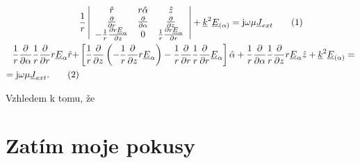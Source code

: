 \documentclass[12pt,a4paper,oneside]{article}
\numberwithin{equation}{section} %
\numberwithin{figure}{section} %
\numberwithin{table}{section} %
\newcommand{\mj}{\mathrm{j}} %
\newcommand{\faz}[1]{{\underline{#1}}} %
\newcommand\numberthis{\addtocounter{equation}{1}\tag{\theequation}}
\begin{document}
\begin{subequations}
\begin{align*}
&\frac{1}{r} \left|
\begin{array}{c c c}
\hat{r} & r\hat{\alpha} & \hat{z} \\
\frac{\partial}{\partial r} & \frac{\partial}{\partial \alpha} & \frac{\partial}{\partial z} \\
- \frac{1}{r} \frac{\partial r \faz{E} _{\alpha}}{\partial z} & 0 & \frac{1}{r} \frac{\partial r \faz{E} _{\alpha}}{\partial r}
\end{array} \right|
+ \faz{k} ^2 \faz{E} _{(\alpha)} = \mj \omega \mu \faz{J} _{ext} 
\numberthis
\\
\frac{1}{r} \frac{\partial}{\partial \alpha} \frac{1}{r} \frac{\partial}{\partial r} r \faz{E} _{\alpha} \hat{r} + &\left[ \frac{1}{r} \frac{\partial}{\partial z} \left( - \frac{1}{r} \frac{\partial}{\partial z} r \faz{E} _{\alpha} \right) - \frac{1}{r} \frac{\partial}{\partial r} \frac{1}{r} \frac{\partial}{\partial r} \faz{E} _{\alpha} \right] \hat{\alpha} + \frac{1}{r} \frac{\partial}{\partial \alpha} \frac{1}{r} \frac{\partial}{\partial z} r \faz{E} _{\alpha} \hat{z} + \faz{k} ^2 \faz{E} _{(\alpha)} =
\\
= \mj \omega \mu \faz{J} _{ext} .
\numberthis
\end{align*}
\end{subequations}

Vzhledem k tomu, že 




\clearpage
\section{Zatím moje pokusy}
\end{document}
